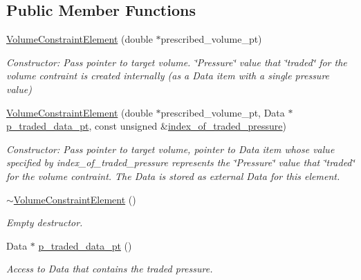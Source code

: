 \subsection*{Public Member Functions}
\begin{DoxyCompactItemize}
\item 
\hyperlink{classoomph_1_1VolumeConstraintElement_a641eea5633b1ddd2d9f79e5731947660}{Volume\+Constraint\+Element} (double $\ast$prescribed\+\_\+volume\+\_\+pt)
\begin{DoxyCompactList}\small\item\em Constructor\+: Pass pointer to target volume. \char`\"{}\+Pressure\char`\"{} value that \char`\"{}traded\char`\"{} for the volume contraint is created internally (as a Data item with a single pressure value) \end{DoxyCompactList}\item 
\hyperlink{classoomph_1_1VolumeConstraintElement_adc0fc16f4fc708fb09d70cb791a6c6b9}{Volume\+Constraint\+Element} (double $\ast$prescribed\+\_\+volume\+\_\+pt, Data $\ast$\hyperlink{classoomph_1_1VolumeConstraintElement_a60d17437a54648747c956b7a7067c592}{p\+\_\+traded\+\_\+data\+\_\+pt}, const unsigned \&\hyperlink{classoomph_1_1VolumeConstraintElement_ada831157effca052df0fae723c21c426}{index\+\_\+of\+\_\+traded\+\_\+pressure})
\begin{DoxyCompactList}\small\item\em Constructor\+: Pass pointer to target volume, pointer to Data item whose value specified by index\+\_\+of\+\_\+traded\+\_\+pressure represents the \char`\"{}\+Pressure\char`\"{} value that \char`\"{}traded\char`\"{} for the volume contraint. The Data is stored as external Data for this element. \end{DoxyCompactList}\item 
\hyperlink{classoomph_1_1VolumeConstraintElement_a160b5edcca9ce59bbd6afe90c3729bbb}{$\sim$\+Volume\+Constraint\+Element} ()
\begin{DoxyCompactList}\small\item\em Empty destructor. \end{DoxyCompactList}\item 
Data $\ast$ \hyperlink{classoomph_1_1VolumeConstraintElement_a60d17437a54648747c956b7a7067c592}{p\+\_\+traded\+\_\+data\+\_\+pt} ()
\begin{DoxyCompactList}\small\item\em Access to Data that contains the traded pressure. \end{DoxyCompactList}\item 

\end{DoxyCompactItemize}
